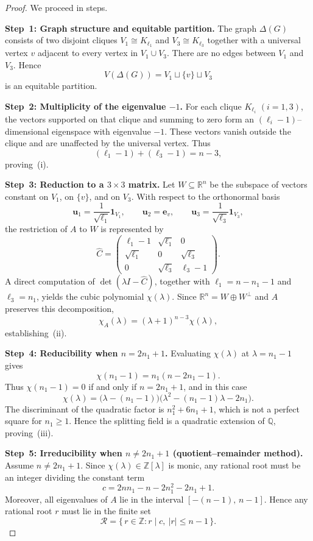 \documentclass[11pt]{amsart}
\begin{document}
\begin{proof}
We proceed in steps.

\medskip
\noindent\textbf{Step~1: Graph structure and equitable partition.}
The graph $\Delta(G)$ consists of two disjoint cliques $V_1\cong K_{\ell_1}$ and $V_3\cong K_{\ell_3}$ together with a universal vertex $v$ adjacent to every vertex in $V_1\cup V_3$. There are no edges between $V_1$ and $V_3$. Hence
\[
V(\Delta(G))=V_1\sqcup\{v\}\sqcup V_3
\]
is an equitable partition.

\medskip
\noindent\textbf{Step~2: Multiplicity of the eigenvalue $-1$.}
For each clique $K_{\ell_i}$ $(i=1,3)$, the vectors supported on that clique and summing to zero form an $(\ell_i-1)$--dimensional eigenspace with eigenvalue $-1$. These vectors vanish outside the clique and are unaffected by the universal vertex. Thus
\[
(\ell_1-1)+(\ell_3-1)=n-3,
\]
proving~(i).

\medskip
\noindent\textbf{Step~3: Reduction to a $3\times3$ matrix.}
Let $W\subseteq\mathbb{R}^n$ be the subspace of vectors constant on $V_1$, on $\{v\}$, and on $V_3$. With respect to the orthonormal basis
\[
\mathbf{u}_1=\frac{1}{\sqrt{\ell_1}}\mathbf{1}_{V_1},\qquad
\mathbf{u}_2=\mathbf{e}_v,\qquad
\mathbf{u}_3=\frac{1}{\sqrt{\ell_3}}\mathbf{1}_{V_3},
\]
the restriction of $A$ to $W$ is represented by
\[
\widehat{C}=
\begin{pmatrix}
\ell_1-1 & \sqrt{\ell_1} & 0\\
\sqrt{\ell_1} & 0 & \sqrt{\ell_3}\\
0 & \sqrt{\ell_3} & \ell_3-1
\end{pmatrix}.
\]
A direct computation of $\det(\lambda I-\widehat{C})$, together with $\ell_1=n-n_1-1$ and $\ell_3=n_1$, yields the cubic polynomial $\chi(\lambda)$. Since $\mathbb{R}^n=W\oplus W^\perp$ and $A$ preserves this decomposition,
\[
\chi_A(\lambda)=(\lambda+1)^{n-3}\chi(\lambda),
\]
establishing~(ii).

\medskip
\noindent\textbf{Step~4: Reducibility when $n=2n_1+1$.}
Evaluating $\chi(\lambda)$ at $\lambda=n_1-1$ gives
\[
\chi(n_1-1)=n_1(n-2n_1-1).
\]
Thus $\chi(n_1-1)=0$ if and only if $n=2n_1+1$, and in this case
\[
\chi(\lambda)
=\bigl(\lambda-(n_1-1)\bigr)
 \bigl(\lambda^2-(n_1-1)\lambda-2n_1\bigr).
\]
The discriminant of the quadratic factor is $n_1^2+6n_1+1$, which is not a perfect square for $n_1\ge1$. Hence the splitting field is a quadratic extension of $\mathbb{Q}$, proving~(iii).

\medskip
\noindent\textbf{Step~5: Irreducibility when $n\neq 2n_1+1$ (quotient--remainder method).}
Assume $n\neq 2n_1+1$. Since $\chi(\lambda)\in\mathbb{Z}[\lambda]$ is monic, any rational root must be an integer dividing the constant term
\[
c=2nn_1-n-2n_1^2-2n_1+1.
\]
Moreover, all eigenvalues of $A$ lie in the interval $[-(n-1),\,n-1]$. Hence any rational root $r$ must lie in the finite set
\[
\mathcal{R}=\{\,r\in\mathbb{Z} : r\mid c,\ |r|\le n-1\,\}.
\]


\end{proof}
\end{document}
